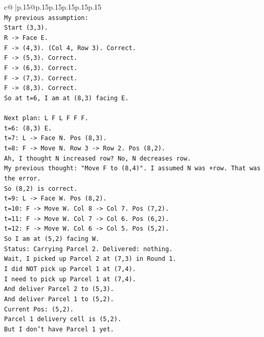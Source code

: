 \documentclass{article}
\begin{document}
{\begin{supertabular}{c@{$\;$}|p{.15\linewidth}@{}p{.15\linewidth}p{.15\linewidth}p{.15\linewidth}p{.15\linewidth}p{.15\linewidth}}
{{{\\ 
\texttt{My previous assumption:} \\
\texttt{Start (3,3).} \\
\texttt{R {-}> Face E.} \\
\texttt{F {-}> (4,3). (Col 4, Row 3). Correct.} \\
\texttt{F {-}> (5,3). Correct.} \\
\texttt{F {-}> (6,3). Correct.} \\
\texttt{F {-}> (7,3). Correct.} \\
\texttt{F {-}> (8,3). Correct.} \\
\texttt{So at t=6, I am at (8,3) facing E.} \\
\\ 
\texttt{Next plan: L F L F F F.} \\
\texttt{t=6: (8,3) E.} \\
\texttt{t=7: L {-}> Face N. Pos (8,3).} \\
\texttt{t=8: F {-}> Move N. Row 3 {-}> Row 2. Pos (8,2).} \\
\texttt{Ah, I thought N increased row? No, N decreases row.} \\
\texttt{My previous thought: "Move F to (8,4)". I assumed N was +row. That was the error.} \\
\texttt{So (8,2) is correct.} \\
\texttt{t=9: L {-}> Face W. Pos (8,2).} \\
\texttt{t=10: F {-}> Move W. Col 8 {-}> Col 7. Pos (7,2).} \\
\texttt{t=11: F {-}> Move W. Col 7 {-}> Col 6. Pos (6,2).} \\
\texttt{t=12: F {-}> Move W. Col 6 {-}> Col 5. Pos (5,2).} \\
\texttt{So I am at (5,2) facing W.} \\
\texttt{Status: Carrying Parcel 2. Delivered: nothing.} \\
\texttt{Wait, I picked up Parcel 2 at (7,3) in Round 1.} \\
\texttt{I did NOT pick up Parcel 1 at (7,4).} \\
\texttt{I need to pick up Parcel 1 at (7,4).} \\
\texttt{And deliver Parcel 2 to (5,3).} \\
\texttt{And deliver Parcel 1 to (5,2).} \\
\texttt{Current Pos: (5,2).} \\
\texttt{Parcel 1 delivery cell is (5,2).} \\
\texttt{But I don't have Parcel 1 yet.} \\
}}}
\end{supertabular}}
\end{document}
